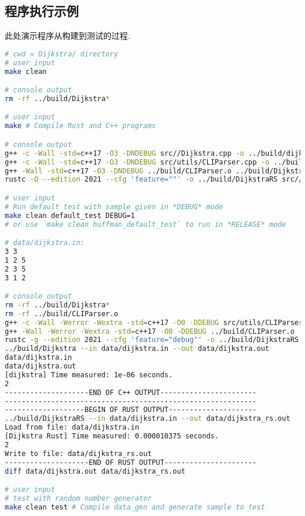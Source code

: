 \subsection{程序执行示例}
\label{sec:dpBench}
此处演示程序从构建到测试的过程.
\begin{lstlisting}[language=bash]
# cwd = Dijkstra/ directory
# user input
make clean

# console output
rm -rf ../build/Dijkstra*

# user input
make # Compile Rust and C++ programs

# console output
g++ -c -Wall -std=c++17 -O3 -DNDEBUG src//Dijkstra.cpp -o ../build/dijkstra.o
g++ -c -Wall -std=c++17 -O3 -DNDEBUG src/utils/CLIParser.cpp -o ../build/CLIParser.o
g++ -Wall -std=c++17 -O3 -DNDEBUG ../build/CLIParser.o ../build/Dijkstra.o -o ../build/Dijkstra
rustc -O --edition 2021 --cfg 'feature=""' -o ../build/DijkstraRS src//main.rs

# user input
# Run default test with sample given in *DEBUG* mode
make clean default_test DEBUG=1
# or use `make clean huffman_default_test` to run in *RELEASE* mode

# data/dijkstra.in:
3 3
1 2 5
2 3 5
3 1 2

# console output
rm -rf ../build/Dijkstra*
rm -rf ../build/CLIParser.o
g++ -c -Wall -Werror -Wextra -std=c++17 -O0 -DDEBUG src/utils/CLIParser.cpp -o ../build/CLIParser.o
g++ -Wall -Werror -Wextra -std=c++17 -O0 -DDEBUG ../build/CLIParser.o ../build/Dijkstra.o -o ../build/Dijkstra
rustc -g --edition 2021 --cfg 'feature="debug"' -o ../build/DijkstraRS src//main.rs
../build/Dijkstra --in data/dijkstra.in --out data/dijkstra.out
data/dijkstra.in
data/dijkstra.out
[dijkstra] Time measured: 1e-06 seconds.
2
--------------------END OF C++ OUTPUT-----------------------
------------------------------------------------------------
-------------------BEGIN OF RUST OUTPUT---------------------
../build/DijkstraRS --in data/dijkstra.in --out data/dijkstra_rs.out
Load from file: data/dijkstra.in
[Dijkstra Rust] Time measured: 0.000010375 seconds.
2
Write to file: data/dijkstra_rs.out
--------------------END OF RUST OUTPUT----------------------
diff data/dijkstra.out data/dijkstra_rs.out

# user input
# test with random number generator
make clean test # Compile data_gen and generate sample to test


\end{lstlisting}
